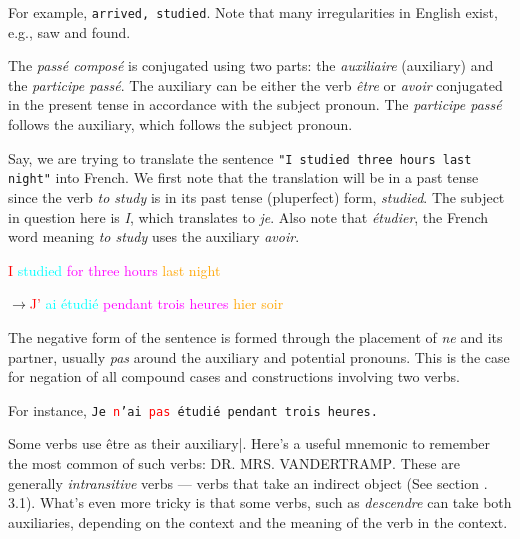 \documentclass[11pt, oneside]{book}
\begin{document}
{For example, \texttt{arrived, studied}. Note that many irregularities in English exist, e.g., saw and found. \vspace{0.5\baselineskip}

The \textit{pass\'e compos\'e} is conjugated using two parts: the \textit{auxiliaire} (auxiliary) and the \textit{participe pass\'e}. The auxiliary can be either the verb \textit{être} or \textit{avoir} conjugated in the present tense in accordance with the subject pronoun. The \textit{participe pass\'e} follows the auxiliary, which follows the subject pronoun. \vspace{0.5\baselineskip}

Say, we are trying to translate the sentence \texttt{"I studied three hours last night"} into French. We first note that the translation will be in a past tense since the verb \textit{to study} is in its past tense (pluperfect) form, \textit{studied}. The subject in question here is \textit{I}, which translates to \textit{je}. Also note that \textit{\'etudier}, the French word meaning \textit{to study} uses the auxiliary \textit{avoir}. \vspace{0.5\baselineskip}

\textcolor{red}{I} \textcolor{cyan}{studied} \textcolor{magenta}{for three hours} \textcolor{orange}{last night}  \vspace{0.5\baselineskip}

$\rightarrow$\textcolor{red}{J'} \textcolor{cyan}{ai \'etudi\'e} \textcolor{magenta}{pendant trois heures} \textcolor{orange}{hier soir} \vspace{0.5\baselineskip} 

The negative form of the sentence is formed through the placement of \textit{ne} and its partner, usually \textit{pas} around the auxiliary and potential pronouns. This is the case for negation of all compound cases and constructions involving two verbs. \vspace{0.5\baselineskip}

For instance, \texttt{Je \textcolor{red}{n}'ai \textcolor{red}{pas} \'etudi\'e pendant trois heures.}  \vspace{0.5\baselineskip}

Some verbs use \^etre as their auxiliary|. Here's a useful mnemonic to remember the most common of such verbs:
\textsc{DR. MRS. VANDERTRAMP}. These are generally \textit{intransitive} verbs — verbs that take an indirect object (See section . 3.1). What's even more tricky is that some verbs, such as \textit{descendre} can take both auxiliaries, depending on the context and the meaning of the verb in the context.

}
\end{document}
